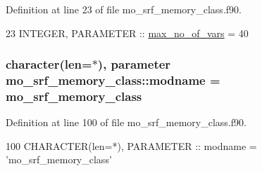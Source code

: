 Definition at line 23 of file mo\+\_\+srf\+\_\+memory\+\_\+class.\+f90.


\begin{DoxyCode}
23   \textcolor{keywordtype}{INTEGER}, \textcolor{keywordtype}{PARAMETER} :: \hyperlink{namespacemo__atmland__memory__class_afae3263e73e4c64ed0955c7ac81cd609}{max\_no\_of\_vars} = 40
\end{DoxyCode}
\hypertarget{namespacemo__srf__memory__class_a0e5b6ff2ea39b47afe54d1162df39955}{}
\subsubsection[{modname}]{\setlength{\rightskip}{0pt plus 5cm}character(len=$\ast$), parameter mo\+\_\+srf\+\_\+memory\+\_\+class\+::modname = \textquotesingle{}mo\+\_\+srf\+\_\+memory\+\_\+class\textquotesingle{}}\label{namespacemo__srf__memory__class_a0e5b6ff2ea39b47afe54d1162df39955}


Definition at line 100 of file mo\+\_\+srf\+\_\+memory\+\_\+class.\+f90.


\begin{DoxyCode}
100   \textcolor{keywordtype}{CHARACTER(len=*)}, \textcolor{keywordtype}{PARAMETER} :: modname = \textcolor{stringliteral}{'mo\_srf\_memory\_class'}
\end{DoxyCode}
